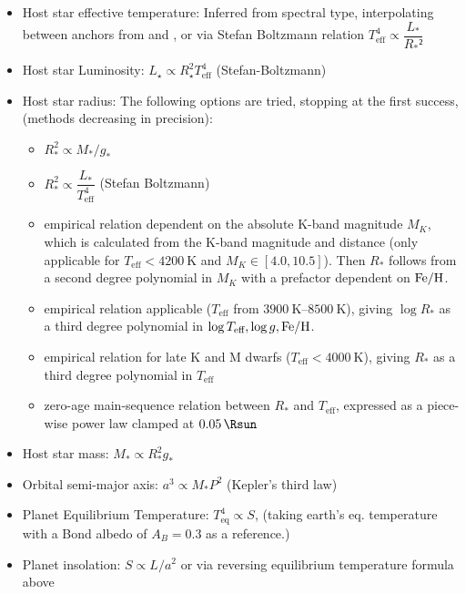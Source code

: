 \begin{itemize}
    \item Host star effective temperature: Inferred from spectral type, interpolating between anchors from \textcite{PecautMamajek2013} and \textcite{Martins2005}, or via Stefan Boltzmann relation $T_\text{eff}^4\propto \dfrac{L_*}{R_*²}$
    \item Host star Luminosity: $L_\star \propto  R_\star^2 T_\mathrm{eff}^4$ (Stefan-Boltzmann)
    \item Host star radius: The following options are tried, stopping at the first success, (methods decreasing in precision):
    \begin{itemize}
        \item $R_*^2 \propto M_* / g_*$
        \item $R_*^2 \propto \dfrac{L_* }{T_\text{eff}^4}$  (Stefan Boltzmann)
        \item \textcite{Mann2015} empirical relation dependent on the absolute K-band magnitude $M_K$, which is calculated from the K-band magnitude and distance (only applicable for $T_\text{eff} < \qty{4200}{\kelvin}$ and $M_K \in[4.0, 10.5]$). Then $R_*$ follows from a second degree polynomial in $M_K$ with a prefactor dependent on $\ce{Fe/H}$.
        \item \textcite{Torres2010} empirical relation applicable ($T_\text{eff}$ from $\qtyrange{3900}{8500}{\kelvin}$), giving $\log R_*$ as a third degree polynomial in $\log T_\text{eff}, \log g, \ce{Fe/H}$.
        \item \textcite{Mann2015} empirical relation for late K and M dwarfs ($T_\text{eff} < \qty{4000}{\kelvin}$), giving $R_*$ as a third degree polynomial in $T_\text{eff}$
        \item \textcite{Boyajian_2012one,Boyajian_2012two, Boyajian_2013} zero-age main-sequence relation between $R_*$ and $T_\text{eff}$, expressed as a piece-wise power law clamped at $\qty{0.05}{\Rsun}$
    \end{itemize}
    \item Host star mass: $M_* \propto R_*^2 g_*$
    \item Orbital semi-major axis:  $a^3  \propto M_* P^2 $ (Kepler's third law)
    \item Planet Equilibrium Temperature: $T_\text{eq} ^4\propto S$, (taking earth's eq. temperature with a Bond albedo of $A_B  = 0.3$ as a reference.)
    \item Planet insolation: $S \propto L/a^2$ or via reversing equilibrium temperature formula above
\end{itemize}                  
